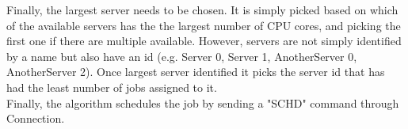 \vspace{.2cm}
Finally, the largest server needs to be chosen. It is simply picked based on which of the available servers has the the largest number of CPU cores, and picking the first one if there are multiple available. However, servers are not simply identified by a name but also have an id (e.g. Server 0, Server 1, AnotherServer 0, AnotherServer 2). Once largest server identified it picks the server id that has had the least number of jobs assigned to it. \\

\vspace{.2cm}
Finally, the algorithm schedules the job by sending a "SCHD" command through Connection.